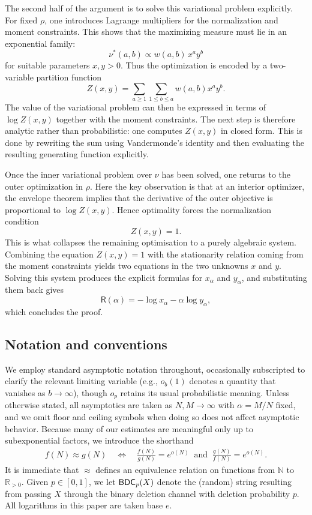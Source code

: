 \documentclass[11pt]{amsart}
\numberwithin{equation}{section}
\numberwithin{equation}{section}
\newcommand{\1}{\mathbbm{1}}
\newcommand{\R}{\mathbb{R}}
\newcommand{\N}{\mathbb{N}}
\newcommand{\BDC}{\textup{\textsf{BDC}}}
\theoremstyle{definition}
\begin{document}
The second half of the argument is to solve this variational problem explicitly. For fixed $\rho$, one introduces Lagrange multipliers for the normalization and moment constraints. This shows that the maximizing measure must lie in an exponential family:
\[
\nu^*(a,b)\propto w(a,b)\,x^a y^b
\]
for suitable parameters $x,y>0$. Thus the optimization is encoded by a two-variable partition function
\[
Z(x,y)=\sum_{a\ge 1}\sum_{1\le b\le a} w(a,b)x^a y^b.
\]
The value of the variational problem can then be expressed in terms of $\log Z(x,y)$ together with the moment constraints. The next step is therefore analytic rather than probabilistic: one computes \(Z(x,y)\) in closed form. This is done by rewriting the sum using Vandermonde’s identity and then evaluating the resulting generating function explicitly.

Once the inner variational problem over $\nu$ has been solved, one returns to the outer optimization in $\rho$. Here the key observation is that at an interior optimizer, the envelope theorem implies that the derivative of the outer objective is proportional to \(\log Z(x,y)\). Hence optimality forces the normalization condition
\[
Z(x,y)=1.
\]
This is what collapses the remaining optimisation to a purely algebraic system. Combining the equation \(Z(x,y)=1\) with the stationarity relation coming from the moment constraints yields two equations in the two unknowns \(x\) and \(y\). Solving this system produces the explicit formulas for \(x_\alpha\) and \(y_\alpha\), and substituting them back gives
\[
\mathsf R(\alpha)=-\log x_\alpha-\alpha\log y_\alpha,
\]
which concludes the proof.

\subsection{Notation and conventions} \label{subsec:notation} 


We employ standard asymptotic notation throughout, occasionally subscripted to clarify the relevant limiting variable (e.g., $o_b(1)$ denotes a quantity that vanishes as $b \to \infty$), though $o_p$ retains its usual probabilistic meaning. Unless otherwise stated, all asymptotics are taken as $N, M \to \infty$ with $\alpha = M/N$ fixed, and we omit floor and ceiling symbols when doing so does not affect asymptotic behavior. Because many of our estimates are meaningful only up to subexponential factors, we introduce the shorthand
\begin{align*}
    f(N) \approx g(N)
    \quad \Longleftrightarrow \quad
    \frac{f(N)}{g(N)} = e^{o(N)} \;\; \text{and} \;\; \frac{g(N)}{f(N)} = e^{o(N)}.
\end{align*}
It is immediate that $\approx$ defines an equivalence relation on functions from $\N$ to $\R_{>0}$. Given $p \in [0,1]$, we let $\BDC_p(X)$ denote the (random) string resulting from passing $X$ through the binary deletion channel with deletion probability $p$. All logarithms in this paper are taken base $e$.
\end{document}
